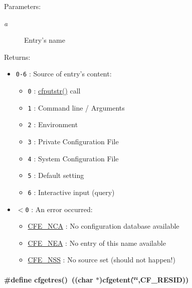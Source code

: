 \begin{Desc}
\item[Parameters:]
\begin{description}
\item[{\em a}]Entry's name\end{description}
\end{Desc}
\begin{Desc}
\item[Returns:]\begin{itemize}
\item {\tt 0-6} : Source of entry's content: \begin{itemize}
\item {\tt 0} : \hyperlink{group__setting__saving_g9553f7a24b080660793a560c2bc8f210}{cfputstr()} call \item {\tt 1} : Command line / Arguments \item {\tt 2} : Environment \item {\tt 3} : Private Configuration File \item {\tt 4} : System Configuration File \item {\tt 5} : Default setting \item {\tt 6} : Interactive input (query)\end{itemize}
\item {\tt $<$0} : An error occurred: \begin{itemize}
\item \hyperlink{group__errors_gf8cd36471ddcc549668f49238855609d}{CFE\_\-NCA} : No configuration database available \item \hyperlink{group__errors_g7f7e54a5ccefa34556fe6da3b35b4f27}{CFE\_\-NEA} : No entry of this name available \item \hyperlink{group__errors_g5db4a12696dff1db26958db1be075be9}{CFE\_\-NSS} : No source set (should not happen!) \end{itemize}
\end{itemize}
\end{Desc}
\hypertarget{group__retrieval_g6ef6076e946383ab198ee26b9aa5603a}{
\paragraph[{cfgetres}]{\setlength{\rightskip}{0pt plus 5cm}\#define cfgetres()~((char $\ast$)cfgetent(\char`\"{}\char`\"{},CF\_\-RESID))}\hfill}
\label{group__retrieval_g6ef6076e946383ab198ee26b9aa5603a}


